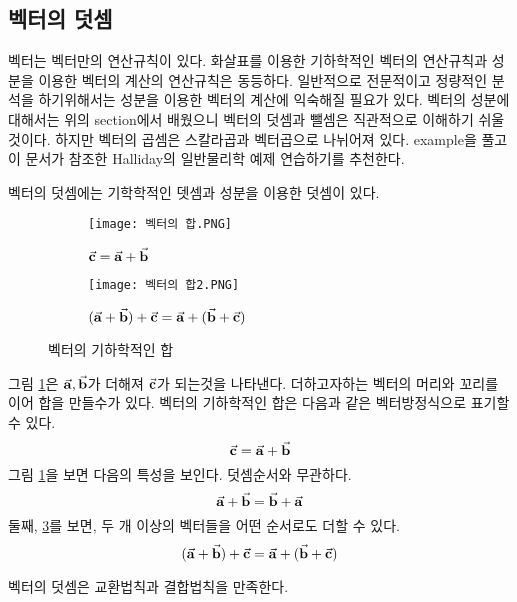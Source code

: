 \begin{flushleft}
  


\subsection{벡터의 덧셈}
벡터는 벡터만의 연산규칙이 있다. 화살표를 이용한 기하학적인 벡터의 연산규칙과 성분을 이용한 벡터의 계산의 연산규칙은 동등하다. 
일반적으로 전문적이고 정량적인 분석을 하기위해서는 성분을 이용한 벡터의 계산에 익숙해질 필요가 있다. 
벡터의 성분에 대해서는 위의 section에서 배웠으니 벡터의 덧셈과 뺄셈은 직관적으로 이해하기 쉬울것이다. 
하지만 벡터의 곱셈은 스칼라곱과 벡터곱으로 나뉘어져 있다. 
example을 풀고 이 문서가 참조한 Halliday의 일반물리학 예제 연습하기를 추천한다. 

벡터의 덧셈에는 기학학적인 뎃셈과 성분을 이용한 덧셈이 있다.


\begin{figure}[h]
  \centering
  \begin{subfigure}[h]{0.4\textwidth}
      \centering
      \texttt{[image: 벡터의 합.PNG]}
      \caption{$\va{c}=\va{a}+\va{b}$}
      \label{그림A}
  \end{subfigure}
  \hfill
  \begin{subfigure}[h]{0.4\textwidth}
      \centering
      \texttt{[image: 벡터의 합2.PNG]}
      \caption{ $(\va{a}+\va{b})+\va{c}=\va{a}+(\va{b}+\va{c})$ }
      \label{그림B}
   \end{subfigure}
     \caption{벡터의 기하학적인 합}
  \end{figure}

 그림 \ref{그림A}은 $\va{a}, \va{b}$가 더해져 $\va{c}$가 되는것을 나타낸다. 더하고자하는 벡터의 머리와 꼬리를 이어 합을 
 만들수가 있다. 벡터의 기하학적인 합은 다음과 같은 벡터방정식으로 표기할 수 있다.
  \begin{equation}
  \va{c}=\va{a}+\va{b}  
\end{equation}
그림 \ref{그림A}을 보면 다음의 특성을 보인다. 덧셈순서와 무관하다. 
  \begin{equation}
\va{a}+\va{b}=\va{b}+\va{a}   
\end{equation}
\noindent 둘째, \ref{그림B}를 보면, 두 개 이상의 벡터들을 어떤 순서로도 더할 수 있다. 
\begin{equation}
  (\va{a}+\va{b})+\va{c}=\va{a}+(\va{b}+\va{c}) 
\end{equation}

벡터의 덧셈은 교환법칙과 결합법칙을 만족한다.




\end{flushleft}
